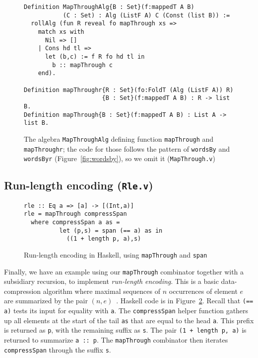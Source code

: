 \documentclass[a4paper,USenglish]{lipics-v2021}
\begin{document}
\begin{figure}
\begin{verbatim}
Definition MapThroughAlg{B : Set}(f:mappedT A B)
           (C : Set) : Alg (ListF A) C (Const (list B)) :=
  rollAlg (fun R reveal fo mapThrough xs => 
    match xs with
      Nil => []
    | Cons hd tl =>
      let (b,c) := f R fo hd tl in
        b :: mapThrough c
    end).

Definition mapThroughr{R : Set}(fo:FoldT (Alg (ListF A)) R)
                      {B : Set}(f:mappedT A B) : R -> list B.
Definition mapThrough{B : Set}(f:mappedT A B) : List A -> list B.
\end{verbatim}
\caption{The algebra \texttt{MapThroughAlg} defining function \texttt{mapThrough} and \texttt{mapThroughr}; the
  code for those follows the pattern of \texttt{wordsBy} and \texttt{wordsByr} (Figure~\ref{fig:wordsby}), so
  we omit it (\texttt{MapThrough.v})}
\label{fig:mapthrough}
\end{figure}

\subsection{Run-length encoding (\texttt{Rle.v})}

\begin{figure}
\begin{verbatim}
rle :: Eq a => [a] -> [(Int,a)]
rle = mapThrough compressSpan
  where compressSpan a as =
          let (p,s) = span (== a) as in
            ((1 + length p, a),s)
\end{verbatim} 
\caption{Run-length encoding in Haskell, using \texttt{mapThrough} and \texttt{span}}
\label{fig:rlehs}
\end{figure}

Finally, we have an example using our \verb|mapThrough| combinator
together with a subsidiary recursion, to implement \emph{run-length
encoding}.  This is a basic data-compression algorithm where maximal
sequences of $n$ occurrences of element $e$ are summarized by the pair
$(n,e)$~\cite{datacomp}.  Haskell code is in Figure~\ref{fig:rlehs}.
Recall that \verb|(== a)| tests its input for equality with \verb|a|.
The \verb|compressSpan| helper function gathers up all elements at the
start of the tail \verb|as| that are equal to the head \verb|a|.  This
prefix is returned as \verb|p|, with the remaining suffix as \verb|s|.
The pair \verb|(1 + length p, a)| is returned to summarize
\verb|a :: p|.  The \verb|mapThrough| combinator then iterates
\verb|compressSpan| through the suffix \verb|s|.
\end{document}
